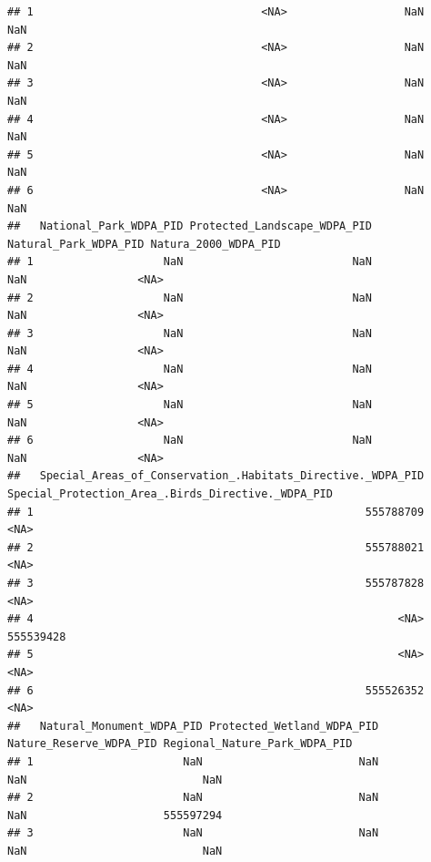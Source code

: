 \documentclass[
]{article}
\begin{document}
\begin{verbatim}
## 1                                   <NA>                  NaN                                                        NaN
## 2                                   <NA>                  NaN                                                        NaN
## 3                                   <NA>                  NaN                                                        NaN
## 4                                   <NA>                  NaN                                                        NaN
## 5                                   <NA>                  NaN                                                        NaN
## 6                                   <NA>                  NaN                                                        NaN
##   National_Park_WDPA_PID Protected_Landscape_WDPA_PID Natural_Park_WDPA_PID Natura_2000_WDPA_PID
## 1                    NaN                          NaN                   NaN                 <NA>
## 2                    NaN                          NaN                   NaN                 <NA>
## 3                    NaN                          NaN                   NaN                 <NA>
## 4                    NaN                          NaN                   NaN                 <NA>
## 5                    NaN                          NaN                   NaN                 <NA>
## 6                    NaN                          NaN                   NaN                 <NA>
##   Special_Areas_of_Conservation_.Habitats_Directive._WDPA_PID Special_Protection_Area_.Birds_Directive._WDPA_PID
## 1                                                   555788709                                               <NA>
## 2                                                   555788021                                               <NA>
## 3                                                   555787828                                               <NA>
## 4                                                        <NA>                                          555539428
## 5                                                        <NA>                                               <NA>
## 6                                                   555526352                                               <NA>
##   Natural_Monument_WDPA_PID Protected_Wetland_WDPA_PID Nature_Reserve_WDPA_PID Regional_Nature_Park_WDPA_PID
## 1                       NaN                        NaN                     NaN                           NaN
## 2                       NaN                        NaN                     NaN                     555597294
## 3                       NaN                        NaN                     NaN                           NaN

\end{verbatim}
\end{document}
